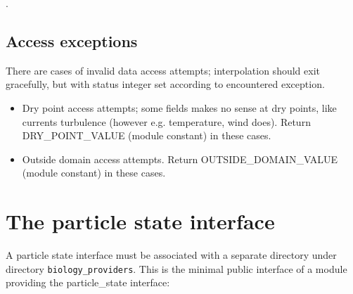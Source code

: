 .

\subsection{Access exceptions}

There are cases of invalid data access attempts; interpolation should exit gracefully, but
with status integer set according to encountered exception. 

\begin{itemize}

    \item Dry point access attempts; some fields makes no sense at dry points, like currents
          turbulence (however e.g. temperature, wind does). Return DRY\_POINT\_VALUE (module constant)
          in these cases.

    \item Outside domain access attempts. Return OUTSIDE\_DOMAIN\_VALUE (module constant)
          in these cases.

\end{itemize}

\section{The particle state interface}

A particle state interface
must be associated with a separate directory under directory {\tt biology\_providers}.
This is the minimal public interface of a module providing
the particle\_state interface:

